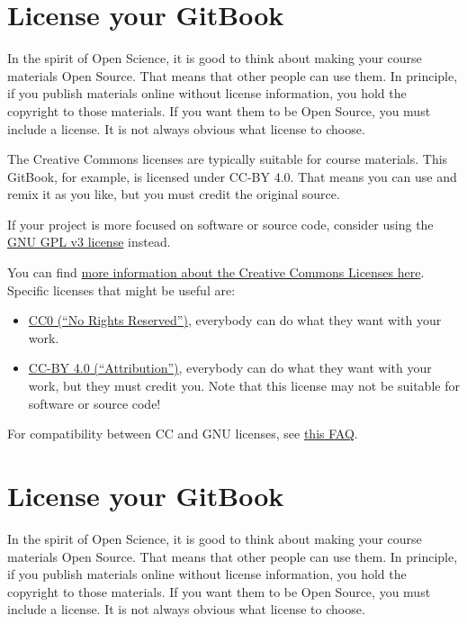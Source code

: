\documentclass[
]{book}
\providecommand{\tightlist}{%
  \setlength{\itemsep}{0pt}\setlength{\parskip}{0pt}}
\begin{document}
\hypertarget{license-your-gitbook}{%
\chapter{License your GitBook}\label{license-your-gitbook}}

In the spirit of Open Science, it is good to think about making your course materials Open Source. That means that other people can use them. In principle, if you publish materials online without license information, you hold the copyright to those materials. If you want them to be Open Source, you must include a license. It is not always obvious what license to choose.

The Creative Commons licenses are typically suitable for course materials. This GitBook, for example, is licensed under CC-BY 4.0. That means you can use and remix it as you like, but you must credit the original source.

If your project is more focused on software or source code, consider using the \href{https://www.gnu.org/licenses/gpl-3.0.en.html}{GNU GPL v3 license} instead.

You can find \href{https://creativecommons.org/share-your-work/licensing-examples}{more information about the Creative Commons Licenses here}. Specific licenses that might be useful are:

\begin{itemize}
\tightlist
\item
  \href{https://creativecommons.org/share-your-work/public-domain/cc0/}{CC0 (``No Rights Reserved'')}, everybody can do what they want with your work.
\item
  \href{https://creativecommons.org/licenses/by/4.0/}{CC-BY 4.0 (``Attribution'')}, everybody can do what they want with your work, but they must credit you. Note that this license may not be suitable for software or source code!
\end{itemize}

For compatibility between CC and GNU licenses, see \href{https://creativecommons.org/faq/\#Can_I_apply_a_Creative_Commons_license_to_software.3F}{this FAQ}.

\hypertarget{license-your-gitbook-1}{%
\chapter{License your GitBook}\label{license-your-gitbook-1}}

In the spirit of Open Science, it is good to think about making your course materials Open Source. That means that other people can use them. In principle, if you publish materials online without license information, you hold the copyright to those materials. If you want them to be Open Source, you must include a license. It is not always obvious what license to choose.
\end{document}
